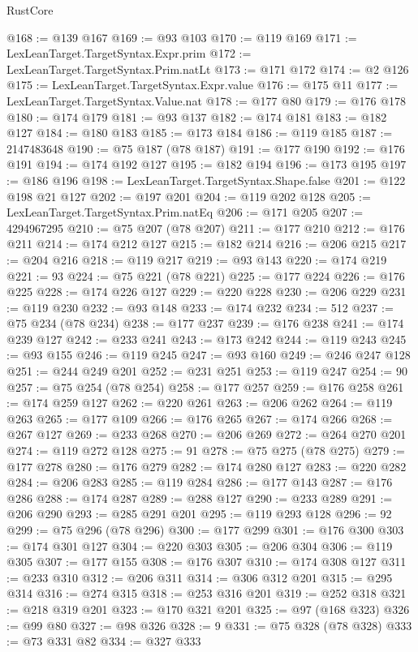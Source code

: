\begin{lexlean}{RustCore}
\begin{coremodule}
@168 := @139 @167
@169 := @93 @103
@170 := @119 @169
@171 := LexLeanTarget.TargetSyntax.Expr.prim
@172 := LexLeanTarget.TargetSyntax.Prim.natLt
@173 := @171 @172
@174 := @2 @126
@175 := LexLeanTarget.TargetSyntax.Expr.value
@176 := @175 @11
@177 := LexLeanTarget.TargetSyntax.Value.nat
@178 := @177 @80
@179 := @176 @178
@180 := @174 @179
@181 := @93 @137
@182 := @174 @181
@183 := @182 @127
@184 := @180 @183
@185 := @173 @184
@186 := @119 @185
@187 := 2147483648
@190 := @75 @187 (@78 @187)
@191 := @177 @190
@192 := @176 @191
@194 := @174 @192 @127
@195 := @182 @194
@196 := @173 @195
@197 := @186 @196
@198 := LexLeanTarget.TargetSyntax.Shape.false
@201 := @122 @198 @21 @127
@202 := @197 @201
@204 := @119 @202 @128
@205 := LexLeanTarget.TargetSyntax.Prim.natEq
@206 := @171 @205
@207 := 4294967295
@210 := @75 @207 (@78 @207)
@211 := @177 @210
@212 := @176 @211
@214 := @174 @212 @127
@215 := @182 @214
@216 := @206 @215
@217 := @204 @216
@218 := @119 @217
@219 := @93 @143
@220 := @174 @219
@221 := 93
@224 := @75 @221 (@78 @221)
@225 := @177 @224
@226 := @176 @225
@228 := @174 @226 @127
@229 := @220 @228
@230 := @206 @229
@231 := @119 @230
@232 := @93 @148
@233 := @174 @232
@234 := 512
@237 := @75 @234 (@78 @234)
@238 := @177 @237
@239 := @176 @238
@241 := @174 @239 @127
@242 := @233 @241
@243 := @173 @242
@244 := @119 @243
@245 := @93 @155
@246 := @119 @245
@247 := @93 @160
@249 := @246 @247 @128
@251 := @244 @249 @201
@252 := @231 @251
@253 := @119 @247
@254 := 90
@257 := @75 @254 (@78 @254)
@258 := @177 @257
@259 := @176 @258
@261 := @174 @259 @127
@262 := @220 @261
@263 := @206 @262
@264 := @119 @263
@265 := @177 @109
@266 := @176 @265
@267 := @174 @266
@268 := @267 @127
@269 := @233 @268
@270 := @206 @269
@272 := @264 @270 @201
@274 := @119 @272 @128
@275 := 91
@278 := @75 @275 (@78 @275)
@279 := @177 @278
@280 := @176 @279
@282 := @174 @280 @127
@283 := @220 @282
@284 := @206 @283
@285 := @119 @284
@286 := @177 @143
@287 := @176 @286
@288 := @174 @287
@289 := @288 @127
@290 := @233 @289
@291 := @206 @290
@293 := @285 @291 @201
@295 := @119 @293 @128
@296 := 92
@299 := @75 @296 (@78 @296)
@300 := @177 @299
@301 := @176 @300
@303 := @174 @301 @127
@304 := @220 @303
@305 := @206 @304
@306 := @119 @305
@307 := @177 @155
@308 := @176 @307
@310 := @174 @308 @127
@311 := @233 @310
@312 := @206 @311
@314 := @306 @312 @201
@315 := @295 @314
@316 := @274 @315
@318 := @253 @316 @201
@319 := @252 @318
@321 := @218 @319 @201
@323 := @170 @321 @201
@325 := @97 (@168 @323)
@326 := @99 @80
@327 := @98 @326
@328 := 9
@331 := @75 @328 (@78 @328)
@333 := @73 @331 @82
@334 := @327 @333

\end{coremodule}
\end{lexlean}
